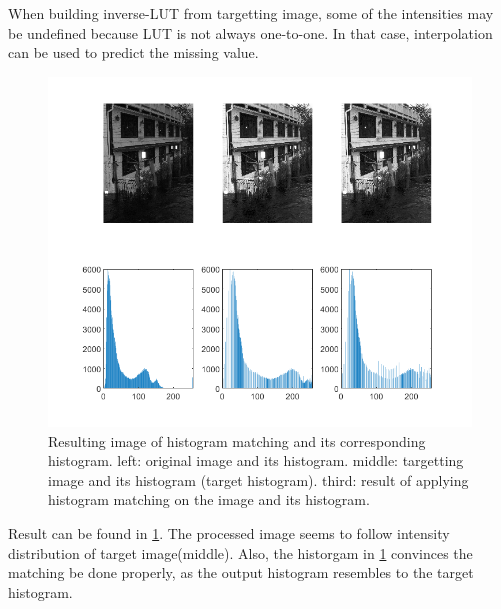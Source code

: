 \documentclass[extendedabs]{bmvc2k}
\begin{document}
When building inverse-LUT from targetting image, some of the intensities
may be undefined because LUT is not always one-to-one. In that case,
interpolation can be used to predict the missing value.

\begin{figure}[h]
    \centering
    \includegraphics[width=0.7\linewidth]{hw1_5}
    \caption{Resulting image of histogram matching and its corresponding histogram. 
    left: original image and its histogram. middle: targetting image and its histogram (target histogram).
    third: result of applying histogram matching on the image and its histogram.}
    \label{fig:7}
    \vspace{-2mm}
\end{figure}

Result can be found in \figurename{\ref{fig:7}}. The processed image
seems to follow intensity distribution of target image(middle).
Also, the historgam in \figurename{\ref{fig:7}} convinces the
matching be done properly, as the output histogram resembles to the 
target histogram.
\end{document}
